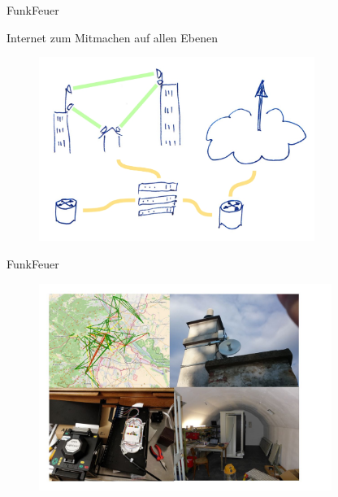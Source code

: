 \documentclass[17pt]{beamer} %
\begin{document}
\begin{frame}{FunkFeuer}

Internet zum Mitmachen auf allen Ebenen

  \begin{figure}
    \includegraphics[width=0.8\textwidth]{figures/FunkFeuer_Ueberblick.jpg}
  \end{figure}
\end{frame}


\begin{frame}{FunkFeuer}
  \begin{figure}
    \includegraphics[width=0.85\textwidth]{figures/FunkFeuer_Bilder.jpg}
  \end{figure}
\end{frame}
\end{document}
